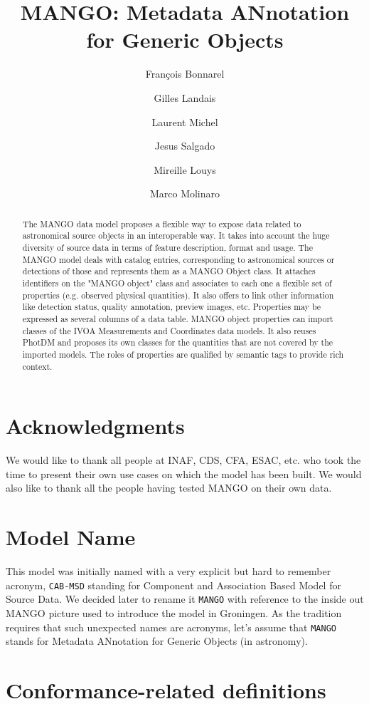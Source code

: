 \documentclass[11pt,a4paper]{ivoa}
\title{MANGO: Metadata ANnotation for Generic Objects}
\author{François Bonnarel}
\author{Gilles Landais}
\author{Laurent Michel}
\author{Jesus Salgado}
\author{Mireille Louys}
\author{Marco Molinaro}
\begin{document}
\begin{abstract}

The MANGO data model proposes a flexible way to expose data related to astronomical source objects 
in an interoperable way.
It takes into account the huge diversity of source data in terms of feature description, format and usage.
The MANGO model deals with catalog entries, corresponding to astronomical sources or detections
of those and represents them as a MANGO Object class.  
It attaches identifiers on the "MANGO object" class and associates to each one a flexible 
set of properties (e.g. observed physical quantities).
It also offers to link other information like detection status, quality annotation, preview images, etc.
Properties may be expressed as several columns of a data table.
MANGO object properties can import classes of the IVOA Measurements
and Coordinates data models.
It also reuses PhotDM and proposes its own classes for the quantities 
that are not covered by the imported models.
The roles of properties are qualified by semantic tags to provide rich context. 

\end{abstract}


\section*{Acknowledgments}

We would like to thank all people at INAF, CDS, CFA, ESAC, etc.  who took the time to present their own use cases on which the model has been built.
We would also like to thank all the people having tested MANGO on their own data.

\section*{Model Name}
This model was initially named with a very explicit but hard to remember acronym, \texttt{CAB-MSD}
standing for Component and Association Based Model for Source Data.
We decided later to rename it \texttt{MANGO} with reference to the inside out MANGO
picture used to introduce the model in Groningen. 
As the tradition requires that such unexpected names are acronyms,
let's assume that \texttt{MANGO} stands for
Metadata ANnotation for Generic Objects (in astronomy).


\section*{Conformance-related definitions}
\end{document}
